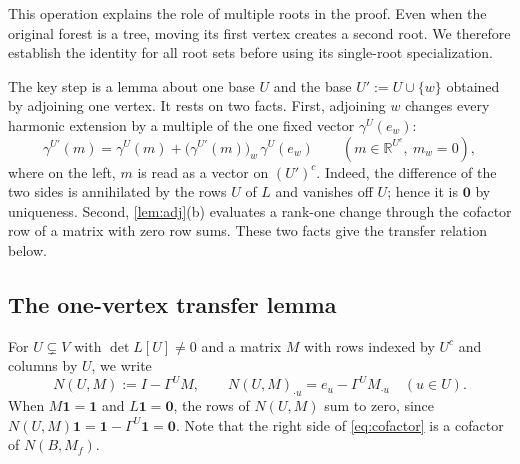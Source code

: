 \documentclass[onefignum,onetabnum]{siamart250211}
\numberwithin{theorem}{section}
\numberwithin{equation}{section}
\newcommand{\R}{\mathbb{R}}
\newcommand{\one}{\mathbf{1}}
\newcommand{\zero}{\mathbf{0}}
\begin{document}
This operation explains the role of multiple roots in the proof.
Even when the original forest is a tree, moving its first vertex
creates a second root. We therefore establish the identity for all
root sets before using its single-root specialization.

The key step is a lemma about one base $U$ and the base
$U':=U\cup\{w\}$ obtained by adjoining one vertex. It rests on two
facts. First, adjoining $w$ changes every harmonic extension by a
multiple of the one fixed vector $\gamma^{U}(e_w)$:
\begin{equation}\label{eq:onestep}
\gamma^{U'}(m)=\gamma^{U}(m)+\big(\gamma^{U'}(m)\big)_w\,\gamma^{U}(e_w)
\qquad(m\in\R^{U^c},\ m_w=0),
\end{equation}
where on the left, $m$ is read as a vector on $(U')^c$. Indeed, the
difference of the two sides is annihilated by the rows $U$ of $L$ and
vanishes off $U$; hence it is $\zero$ by uniqueness. Second, \cref{lem:adj}(b) evaluates a rank-one change through the
cofactor row of a matrix with zero row sums. These two facts give the
transfer relation below.

\subsection{The one-vertex transfer lemma}

For $U\subsetneq V$ with $\det L[U]\ne0$ and a matrix $M$ with rows
indexed by $U^c$ and columns by $U$, we write
\begin{equation}\label{eq:N}
N(U,M):=I-\Gamma^UM,\qquad
N(U,M)_{\cdot u}=e_u-\Gamma^UM_{\cdot u}\quad(u\in U).
\end{equation}
When $M\one=\one$ and $L\one=\zero$, the rows of $N(U,M)$ sum to zero,
since $N(U,M)\one=\one-\Gamma^U\one=\zero$. Note that the right side of
\eqref{eq:cofactor} is a cofactor of $N(B,M_f)$.
\end{document}
